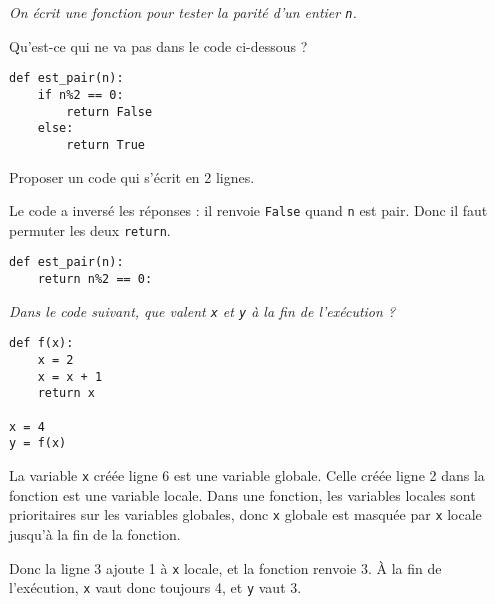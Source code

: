 \newpage
\begin{Exercise}\it
On écrit une fonction pour tester la parité d'un entier \lstinline|n|. 

Qu'est-ce qui ne va pas dans le code ci-dessous ?

\begin{lstlisting}
def est_pair(n):
    if n%2 == 0:
        return False
    else:
        return True
\end{lstlisting}

Proposer un code qui s'écrit en 2 lignes.
\end{Exercise}
\begin{Answer}
Le code a inversé les réponses : il renvoie \lstinline|False| quand \lstinline|n| est pair. Donc il faut permuter les deux \lstinline|return|.
\begin{lstlisting}
def est_pair(n):
    return n%2 == 0:
\end{lstlisting}
\end{Answer}
\begin{Exercise}\it
Dans le code suivant, que valent \lstinline|x| et \lstinline|y| à la fin de l'exécution ?

\begin{lstlisting}
def f(x):
    x = 2
    x = x + 1
    return x

x = 4
y = f(x)
\end{lstlisting}
\end{Exercise}
\begin{Answer}La variable \lstinline|x| créée ligne 6 est une variable globale. Celle créée ligne 2 dans la fonction est une variable locale. Dans une fonction, les variables locales sont prioritaires sur les variables globales, donc \lstinline|x| globale est masquée par \lstinline|x| locale jusqu'à la fin de la fonction.

Donc la ligne 3 ajoute 1 à \lstinline|x| locale, et la fonction renvoie 3. À la fin de l'exécution, \lstinline|x| vaut donc toujours 4, et \lstinline|y| vaut 3.
\end{Answer}
